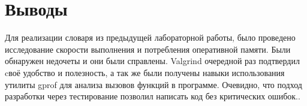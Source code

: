 \section{Выводы}
Для реализации словаря из предыдущей лабораторной работы, было проведено исследование скорости 
выполнения и потребления оперативной памяти. Были обнаружен недочеты и они были справлены.
Valgrind очередной раз подтвердил cвоё удобство и полезность, а так же были получены навыки использования
утилиты gprof для анализа вызовов функций в программе. Очевидно, что подход разработки через тестирование 
позволил написать код без критических ошибок..